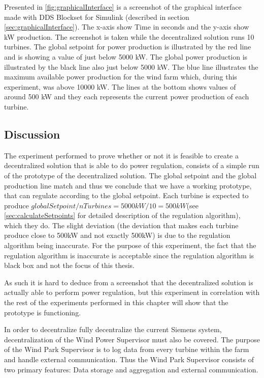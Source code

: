 Presented in \cref{fig:graphicalInterface} is a screenshot of the graphical interface made with DDS Blockset for Simulink (described in section \cref{sec:graphicalInterface}). The x-axis show Time in seconds and the y-axis show kW production. The screenshot is taken while the decentralized solution runs 10 turbines.
The global setpoint for power production is illustrated by the red line and is showing a value of just below 5000 kW. The global power production is illustrated by the black line also just below 5000 kW.
The blue line illustrates the maximum available power production for the wind farm which, during this experiment, was above 10000 kW. The lines at the bottom shows values of around 500 kW and they each represents the current power production of each turbine.

\subsection{Discussion}\label{feas:discussion}
The experiment performed to prove whether or not it is feasible to create a decentralized solution that is able to do power regulation, consists of a simple run of the prototype of the decentralized solution. The global setpoint and the global production line match and thus we conclude that we have a working prototype, that can regulate according to the global setpoint. Each turbine is expected to produce $globalSetpoint/nTurbines=5000kW/10=500kW$(see \cref{sec:calculateSetpoints} for detailed description of the regulation algorithm), which they do. The slight deviation (the deviation that makes each turbine produce close to 500kW and not exactly 500kW) is due to the regulation algorithm being inaccurate. For the purpose of this experiment, the fact that the regulation algorithm is inaccurate is acceptable since the regulation algorithm is black box and not the focus of this thesis.

As such it is hard to deduce from a screenshot that the decentralized solution is actually able to perform power regulation, but this experiment in correlation with the rest of the experiments performed in this chapter will show that the prototype is functioning.

In order to decentralize fully decentralize the current Siemens system, decentralization of the Wind Power Supervisor must also be covered. The purpose of the Wind Park Supervisor is to log data from every turbine within the farm and handle external communication. Thus the Wind Park Supervisor consists of two primary features: Data storage and aggregation and external communication. 

